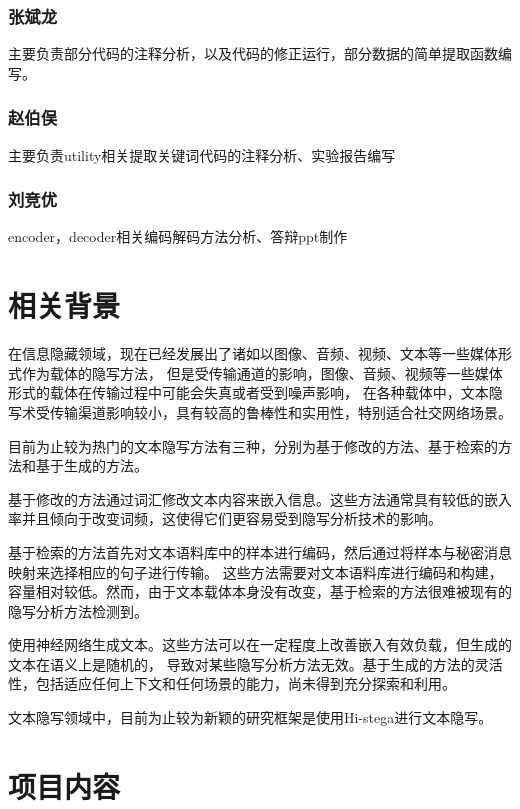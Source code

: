 \documentclass[a4paper,11pt,UTF8]{ctexart}
\begin{document}
      \subsubsection{张斌龙}
        主要负责部分代码的注释分析，以及代码的修正运行，部分数据的简单提取函数编写。
      \subsubsection{赵伯俣}
        主要负责utility相关提取关键词代码的注释分析、实验报告编写
      \subsubsection{刘竞优}
        encoder，decoder相关编码解码方法分析、答辩ppt制作

\section{相关背景}
\setlength{\parindent}{2em}
  在信息隐藏领域，现在已经发展出了诸如以图像、音频、视频、文本等一些媒体形式作为载体的隐写方法，
  但是受传输通道的影响，图像、音频、视频等一些媒体形式的载体在传输过程中可能会失真或者受到噪声影响，
  在各种载体中，文本隐写术受传输渠道影响较小，具有较高的鲁棒性和实用性，特别适合社交网络场景。\par
  目前为止较为热门的文本隐写方法有三种，分别为基于修改的方法、基于检索的方法和基于生成的方法。\par
  基于修改的方法\cite{ref2}通过词汇修改文本内容来嵌入信息。这些方法通常具有较低的嵌入率并且倾向于改变词频，这使得它们更容易受到隐写分析技术的影响。\par
  基于检索的方法\cite{ref3}首先对文本语料库中的样本进行编码，然后通过将样本与秘密消息映射来选择相应的句子进行传输。
  这些方法需要对文本语料库进行编码和构建，容量相对较低。然而，由于文本载体本身没有改变，基于检索的方法很难被现有的隐写分析方法检测到。\par
  使用神经网络生成文本\cite{ref4}。这些方法可以在一定程度上改善嵌入有效负载，但生成的文本在语义上是随机的，
  导致对某些隐写分析方法无效。基于生成的方法的灵活性，包括适应任何上下文和任何场景的能力，尚未得到充分探索和利用。\par
  文本隐写领域中，目前为止较为新颖的研究框架是使用Hi-stega进行文本隐写。

\section{项目内容}
\end{document}
